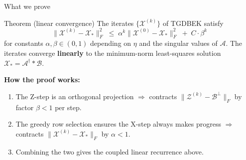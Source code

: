 \documentclass[aspectratio=169,10pt]{beamer}
\def\fm#1{\mathcal{#1}}
\begin{document}
\begin{frame}{What we prove}

  \begin{block}{Theorem (linear convergence)}
    The iterates $\{\fm{X}^{(k)}\}$ of TGDBEK satisfy
    \[
      \|\fm{X}^{(k)} - \fm{X}_*\|_F^2
      \;\leq\;
      \alpha^k \|\fm{X}^{(0)} - \fm{X}_*\|_F^2 \;+\; C \cdot \beta^k
    \]
    for constants $\alpha, \beta \in (0,1)$ depending on $\eta$ and the
    singular values of $\fm{A}$.
    The iterates converge \textbf{linearly} to the minimum-norm
    least-squares solution $\fm{X}_* = \fm{A}^\dagger * \fm{B}$.
  \end{block}

  \bigskip
  \textbf{How the proof works:}
  \begin{enumerate}
    \item The Z-step is an orthogonal projection $\Rightarrow$ contracts
          $\|\fm{Z}^{(k)} - \fm{B}^\perp\|_F$ by factor $\beta < 1$ per step.
    \item The greedy row selection ensures the X-step always makes progress
          $\Rightarrow$ contracts $\|\fm{X}^{(k)} - \fm{X}_*\|_F$ by $\alpha < 1$.
    \item Combining the two gives the coupled linear recurrence above.
  \end{enumerate}

\end{frame}
\end{document}
